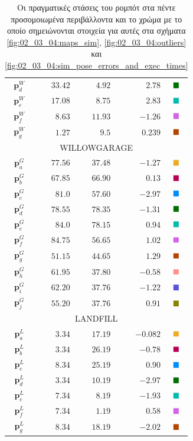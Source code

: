 \begin{table}
\begin{tabular} {c|rrrc}
    $\bm{p}_d^W$   & $33.42$   & $4.92$    & $2.78$          & $\squared$ \\
    $\bm{p}_e^W$   & $17.08$   & $8.75$    & $2.83$          & $\squaree$ \\
    $\bm{p}_f^W$   & $8.63$    & $11.93$   & $-1.26$         & $\squaref$ \\
    $\bm{p}_g^W$   & $1.27$    & $9.5$     & $0.239$         & $\squareg$ \\ \midrule
    \multicolumn{5}{c}{WILLOWGARAGE}                                      \\ \midrule
    $\bm{p}_a^G$   & $77.56$   & $37.48$   & $-1.27$         & $\squarea$ \\
    $\bm{p}_b^G$   & $67.85$   & $66.90$   & $0.13$          & $\squareb$ \\
    $\bm{p}_c^G$   & $81.0$    & $57.60$   & $-2.97$         & $\squarec$ \\
    $\bm{p}_d^G$   & $78.55$   & $78.35$   & $-1.31$         & $\squared$ \\
    $\bm{p}_e^G$   & $84.0$    & $78.15$   & $0.94$          & $\squaree$ \\
    $\bm{p}_f^G$   & $84.75$   & $56.65$   & $1.02$          & $\squaref$ \\
    $\bm{p}_g^G$   & $51.15$   & $44.65$   & $1.29$          & $\squareg$ \\
    $\bm{p}_h^G$   & $61.95$   & $37.80$   & $-0.58$         & $\squareh$ \\
    $\bm{p}_i^G$   & $62.20$   & $37.76$   & $-1.22$         & $\squarei$ \\
    $\bm{p}_j^G$   & $55.20$   & $37.76$   & $0.91$          & $\squarej$ \\ \midrule
    \multicolumn{5}{c}{LANDFILL}                                          \\ \midrule
    $\bm{p}_a^L$   & $3.34$    & $17.19$   & $-0.082$        & $\squarea$ \\
    $\bm{p}_b^L$   & $3.34$    & $26.19$   & $-0.78$         & $\squareb$ \\
    $\bm{p}_c^L$   & $8.34$    & $25.19$   & $0.90$          & $\squarec$ \\
    $\bm{p}_d^L$   & $3.34$    & $10.19$   & $-2.97$         & $\squared$ \\
    $\bm{p}_e^L$   & $7.34$    & $8.19$    & $-1.93$         & $\squaree$ \\
    $\bm{p}_f^L$   & $7.34$    & $1.19$    & $0.58$          & $\squaref$ \\
    $\bm{p}_g^L$   & $8.34$    & $18.19$   & $-2.02$         & $\squareg$ \\ \bottomrule
  \end{tabular}
  \caption{\small Οι πραγματικές στάσεις του ρομπότ στα πέντε προσομοιωμένα
           περιβάλλοντα και το χρώμα με το οποίο σημειώνονται στοιχεία για
           αυτές στα σχήματα \ref{fig:02_03_04:maps_sim},
           \ref{fig:02_03_04:outliers} και
           \ref{fig:02_03_04:sim_pose_errors_and_exec_times}}
  \label{tbl:02_03_04:true_poses_simulation}
\end{table}




